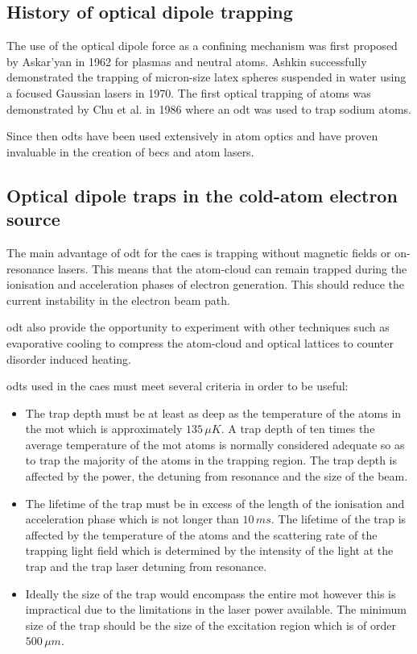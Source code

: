 \subsection{History of optical dipole trapping}
The use of the optical dipole force as a confining mechanism was first proposed by Askar'yan in 1962\cite{askaryan_effects_1962} for plasmas and neutral atoms. Ashkin successfully demonstrated the trapping of micron-size latex spheres suspended in water using a focused Gaussian lasers in 1970\cite{ashkin_acceleration_1970}. The first optical trapping of atoms was demonstrated by Chu et al. in 1986\cite{chu_experimental_1986} where an \gls{odt} was used to trap sodium atoms.

Since then \glspl{odt} have been used extensively in atom optics and have proven invaluable in the creation of \glspl{bec} and atom lasers.

\subsection{Optical dipole traps in the cold-atom electron source}

The main advantage of \gls{odt} for the \gls{caes} is trapping without magnetic fields or on-resonance lasers. This means that the atom-cloud can remain trapped during the ionisation and acceleration phases of electron generation. This should reduce the current instability in the electron beam path.

\Gls{odt} also provide the opportunity to experiment with other techniques such as evaporative cooling to compress the atom-cloud and optical lattices\cite{fallani_bose-einstein_2005} to counter disorder induced heating\cite{gericke_disorder-induced_2003}.

\Glspl{odt} used in the \gls{caes} must meet several criteria in order to be useful:
\begin{itemize}
    \item The trap depth must be at least as deep as the temperature of the atoms in the \gls{mot} which is approximately $135\,\unit{\mu K}$. A trap depth of ten times the average temperature of the \gls{mot} atoms is normally considered adequate so as to trap the majority of the atoms in the trapping region. The trap depth is affected by the power, the detuning from resonance and the size of the beam.
    \item The lifetime of the trap must be in excess of the length of the  ionisation and acceleration phase which is not longer than $10\,\unit{ms}$. The lifetime of the trap is affected by the temperature of the atoms and the scattering rate of the trapping light field which is determined by the intensity of the light at the trap and the trap laser detuning from resonance.
    \item Ideally the size of the trap would encompass the entire \gls{mot} however this is impractical due to the limitations in the laser power available. The minimum size of the trap should be the size of the excitation region which is of order $500\,\unit{\mu m}$\cite{mcculloch_towards_2012}.
\end{itemize}

